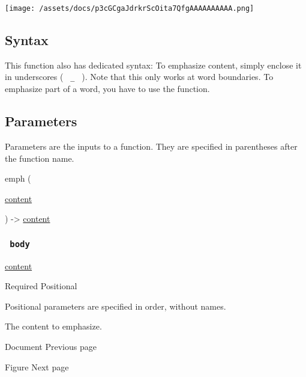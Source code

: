 \texttt{[image: /assets/docs/p3cGCgaJdrkrScOita7QfgAAAAAAAAAA.png]}

\subsection{Syntax}\label{syntax}

This function also has dedicated syntax: To emphasize content, simply
enclose it in underscores ( \texttt{\ \_\ } ). Note that this only works
at word boundaries. To emphasize part of a word, you have to use the
function.

\subsection{\texorpdfstring{{ Parameters
}}{ Parameters }}\label{parameters}

\label{parameters-tooltip}
Parameters are the inputs to a function. They are specified in
parentheses after the function name.

{ emph } (

{ \href{/docs/reference/foundations/content/}{content} }

) -\textgreater{} \href{/docs/reference/foundations/content/}{content}

\subsubsection{\texorpdfstring{\texttt{\ body\ }}{ body }}\label{parameters-body}

\href{/docs/reference/foundations/content/}{content}

{Required} {{ Positional }}

\label{parameters-body-positional-tooltip}
Positional parameters are specified in order, without names.

The content to emphasize.

\href{/docs/reference/model/document/}{\pandocbounded{}}

{ Document } { Previous page }

\href{/docs/reference/model/figure/}{\pandocbounded{}}

{ Figure } { Next page }
